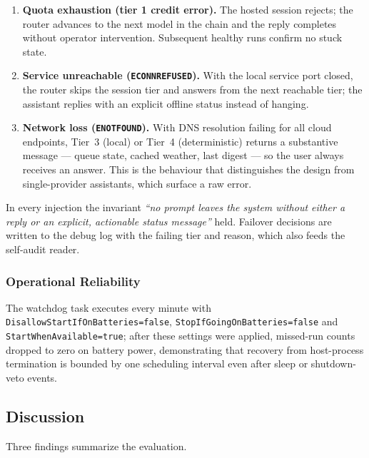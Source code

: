 \begin{enumerate}
  \item \textbf{Quota exhaustion (tier 1 credit error).} The
  hosted session rejects; the router advances to the next model
  in the chain and the reply completes without operator
  intervention. Subsequent healthy runs confirm no stuck state.
  \item \textbf{Service unreachable (\texttt{ECONNREFUSED}).}
  With the local service port closed, the router skips the
  session tier and answers from the next reachable tier; the
  assistant replies with an explicit offline status instead of
  hanging.
  \item \textbf{Network loss (\texttt{ENOTFOUND}).} With DNS
  resolution failing for all cloud endpoints, Tier~3 (local) or
  Tier~4 (deterministic) returns a substantive message ---
  queue state, cached weather, last digest --- so the user
  always receives an answer. This is the behaviour that
  distinguishes the design from single-provider assistants,
  which surface a raw error.
\end{enumerate}

In every injection the invariant \emph{``no prompt leaves the
system without either a reply or an explicit, actionable status
message''} held. Failover decisions are written to the debug log
with the failing tier and reason, which also feeds the
self-audit reader.

\subsubsection{Operational Reliability}

The watchdog task executes every minute with
\texttt{DisallowStartIfOnBatteries=false},
\texttt{StopIfGoingOnBatteries=false} and
\texttt{StartWhenAvailable=true}; after these settings were
applied, missed-run counts dropped to zero on battery power,
demonstrating that recovery from host-process termination is
bounded by one scheduling interval even after sleep or
shutdown-veto events.

\subsection{Discussion}

Three findings summarize the evaluation.

